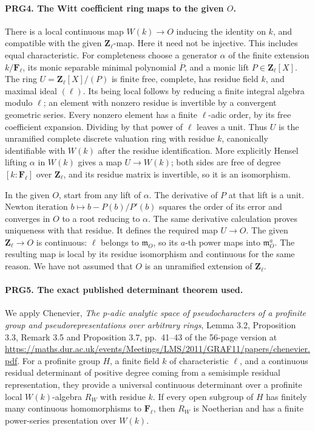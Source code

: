 \paragraph{PRG4. The Witt coefficient ring maps to the given \(O\).}
\label{claim:PRG4}
There is a local continuous map \(W(k)\to O\) inducing the identity
on \(k\), and compatible with the given \(\mathbf Z_\ell\)-map.
Here it need not be injective. This includes equal characteristic.
For completeness choose a generator \(\alpha\) of the finite
extension \(k/\mathbf F_\ell\), its monic separable minimal
polynomial \(\overline P\), and a monic lift
\(P\in\mathbf Z_\ell[X]\). The ring
\(U=\mathbf Z_\ell[X]/(P)\) is finite free, complete, has residue
field \(k\), and maximal ideal \((\ell)\). Its being local follows
by reducing a finite integral algebra modulo \(\ell\); an element
with nonzero residue is invertible by a convergent geometric series.
Every nonzero element has a finite \(\ell\)-adic order, by its
free coefficient expansion. Dividing by that power of \(\ell\)
leaves a unit. Thus \(U\) is the unramified complete discrete
valuation ring with residue \(k\), canonically identifiable with
\(W(k)\) after the residue identification. More explicitly Hensel
lifting \(\alpha\) in \(W(k)\) gives a map \(U\to W(k)\);
both sides are free of degree \([k:\mathbf F_\ell]\) over
\(\mathbf Z_\ell\), and its residue matrix is invertible, so it
is an isomorphism.

In the given \(O\), start from any lift of \(\alpha\).
The derivative of \(P\) at that lift is a unit. Newton iteration
\(b\mapsto b-P(b)/P'(b)\) squares the order of its error and
converges in \(O\) to a root reducing to \(\alpha\). The same
derivative calculation proves uniqueness with that residue. It
defines the required map \(U\to O\). The given
\(\mathbf Z_\ell\to O\) is continuous: \(\ell\) belongs to
\(\mathfrak m_O\), so its \(a\)-th power maps into
\(\mathfrak m_O^a\). The resulting map is local by its residue
isomorphism and continuous for the same reason. We have not assumed
that \(O\) is an unramified extension of \(\mathbf Z_\ell\).

\paragraph{PRG5. The exact published determinant theorem used.}
\label{claim:PRG5}
We apply Chenevier, \emph{The p-adic analytic space of pseudocharacters
of a profinite group and pseudorepresentations over arbitrary rings},
Lemma 3.2, Proposition 3.3, Remark 3.5 and Proposition 3.7,
pp.~41--43 of the 56-page version at
\url{https://maths.dur.ac.uk/events/Meetings/LMS/2011/GRAF11/papers/chenevier.pdf}.
For a profinite group \(H\), a finite field \(k\) of characteristic
\(\ell\), and a continuous residual determinant of positive degree
coming from a semisimple residual representation, they provide a
universal continuous determinant over a profinite local
\(W(k)\)-algebra \(R_W\) with residue \(k\). If every open subgroup
of \(H\) has finitely many continuous homomorphisms to
\(\mathbf F_\ell\), then \(R_W\) is Noetherian and has a finite
power-series presentation over \(W(k)\).

